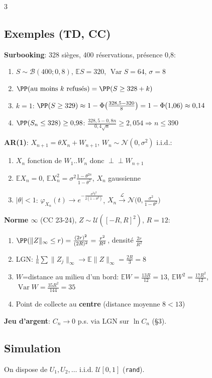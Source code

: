 \documentclass[12pt, a4paper]{article}
\newcommand{\E}{\mathbb{E}}
\newcommand{\Var}{\operatorname{Var}}
\begin{document}
\begin{multicols*}{3}
	\subsection{Exemples (TD, CC)}
	\textbf{Surbooking}: 328 sièges, 400 réservations, présence 0,8:
	\begin{enumerate}[\roman*.]
		\item $S\sim\mathcal B(400;0{,}8)$, $\E S=320$, $\Var S=64$, $\sigma=8$
		\item $\PP(\text{au moins $k$ refusés})=\PP(S\geq328+k)$
		\item $k=1$: $\PP(S\geq329)\approx1-\Phi\big(\frac{328{,}5-320}{8}\big)=1-\Phi(1{,}06)\approx0{,}14$
		\item $\PP(S_n\leq328)\geq0{,}98$: $\frac{328{,}5-0{,}8n}{0{,}4\sqrt n}\geq2{,}054\Rightarrow n\leq390$
	\end{enumerate}
	\textbf{AR(1)}: $X_{n+1}=\theta X_n+W_{n+1}$, $W_n\sim\mathcal N(0,\sigma^2)$ i.i.d.:
	\begin{enumerate}[\roman*.]
		\item $X_n$ fonction de $W_1..W_n$ donc $\perp\!\!\!\perp W_{n+1}$
		\item $\E X_n=0$, $\E X_n^2=\sigma^2\frac{1-\theta^{2n}}{1-\theta^2}$, $X_n$ gaussienne
		\item $|\theta|<1$: $\varphi_{X_n}(t)\to e^{-\frac{\sigma^2t^2}{2(1-\theta^2)}}$, $X_n\xrightarrow{\mathcal L}\mathcal N\big(0,\frac{\sigma^2}{1-\theta^2}\big)$
	\end{enumerate}
	\textbf{Norme $\infty$} (CC 23-24), $Z\sim\mathcal U([-R,R]^2)$, $R=12$:
	\begin{enumerate}[\roman*.]
		\item $\PP(\|Z\|_\infty\leq r)=\frac{(2r)^2}{(2R)^2}=\frac{r^2}{R^2}$, densité $\frac{2r}{R^2}$
		\item LGN: $\frac1n\sum\|Z_j\|_\infty\to\E\|Z\|_\infty=\frac{2R}3=8$
		\item $W$=distance au milieu d'un bord: $\E W=\frac{13R}{12}=13$, $\E W^2=\frac{17R^2}{12}$, $\Var W=\frac{35R^2}{144}=35$
		\item Point de collecte au \textbf{centre} (distance moyenne $8<13$)
	\end{enumerate}
	\textbf{Jeu d'argent}: $C_n\to0$ p.s. via LGN sur $\ln C_n$ (§3).

	\colbreak
	\subsection{Simulation}
	On dispose de $U_1,U_2,\dots$ i.i.d. $\mathcal U[0,1]$ (\texttt{rand}).


\end{multicols*}
\end{document}
